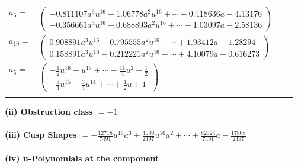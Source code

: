 \documentclass[1p]{elsarticle_modified}
\theoremstyle{definition}
\begin{document}
\begin{tabular}{m{7pt} m{180pt} m{7pt} m{180pt} }
\flushright $a_{6}=$&$\begin{pmatrix}-0.811107 a^{3} u^{16}+1.06778 a^{2} u^{16}+\cdots+0.418636 a-4.13176\\-0.356661 a^{3} u^{16}+0.688893 a^{2} u^{16}+\cdots-1.03097 a-2.58136\end{pmatrix}$ \\
\flushright $a_{10}=$&$\begin{pmatrix}0.908891 a^{3} u^{16}-0.795555 a^{2} u^{16}+\cdots+1.93412 a-1.28294\\0.158891 a^{3} u^{16}-0.212221 a^{2} u^{16}+\cdots+4.10079 a-0.616273\end{pmatrix}$ \\
\flushright $a_{5}=$&$\begin{pmatrix}-\frac{1}{2} u^{16}- u^{15}+\cdots-\frac{11}{4} u^2+\frac{1}{2}\\-\frac{3}{4} u^{15}-\frac{3}{4} u^{14}+\cdots+\frac{1}{2} u+1\end{pmatrix}$\\&\end{tabular}
\flushleft \textbf{(ii) Obstruction class $= -1$}\\~\\
\flushleft \textbf{(iii) Cusp Shapes $= -\frac{12718}{7491} u^{16} a^3+\frac{4539}{2497} u^{16} a^2+\cdots+\frac{82924}{7491} a-\frac{17808}{2497}$}\\~\\
\newpage\renewcommand{\arraystretch}{1}
\flushleft \textbf{(iv) u-Polynomials at the component}\newline \\
\end{document}
